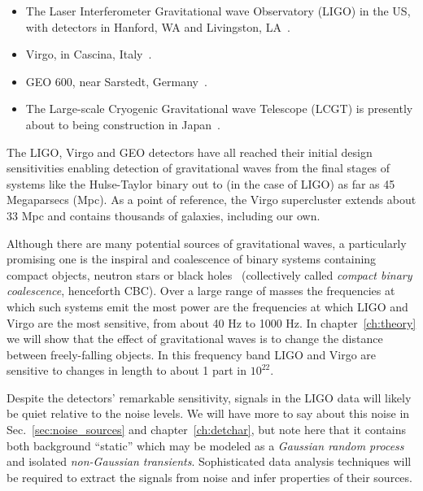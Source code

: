 \begin{itemize}

\item The Laser Interferometer Gravitational wave Observatory (LIGO)
in the US, with detectors in Hanford, WA and Livingston,
LA~\cite{Sigg:2008}.

\item Virgo, in Cascina, Italy~\cite{Acernese:2008}.

\item GEO 600, near Sarstedt, Germany~\cite{Grote:2008}.

\item The Large-scale Cryogenic Gravitational wave Telescope (LCGT) is
presently about to being construction in
Japan~\cite{0264-9381-27-8-084004}.
\end{itemize}

The LIGO, Virgo and GEO detectors have all reached their initial
design sensitivities enabling detection of gravitational waves from
the final stages of systems like the Hulse-Taylor binary out to (in
the case of LIGO) as far as 45 Megaparsecs (Mpc).  As a point of
reference, the Virgo supercluster extends about 33 Mpc and contains
thousands of galaxies, including our own.

Although there are many potential sources of gravitational waves, a
particularly promising one is the inspiral and coalescence of binary
systems containing compact objects, neutron stars or black
holes~\cite{thorne.k:1987} (collectively called \emph{compact binary
coalescence}, henceforth CBC).  Over a large range of masses the
frequencies at which such systems emit the most power are the
frequencies at which LIGO and Virgo are the most sensitive, from about
40 Hz to 1000 Hz.  In chapter~\ref{ch:theory} we will show that the
effect of gravitational waves is to change the distance between
freely-falling objects.  In this frequency band LIGO and Virgo are
sensitive to changes in length to about 1 part in $10^22$.

Despite the detectors' remarkable sensitivity, signals in the LIGO
data will likely be quiet relative to the noise levels.  We will have
more to say about this noise in Sec.~\ref{sec:noise_sources} and
chapter~\ref{ch:detchar}, but note here that it contains both
background ``static'' which may be modeled as a \emph{Gaussian random
process} and isolated \emph{non-Gaussian transients}.  Sophisticated
data analysis techniques will be required to extract the signals from
noise and infer properties of their sources.

